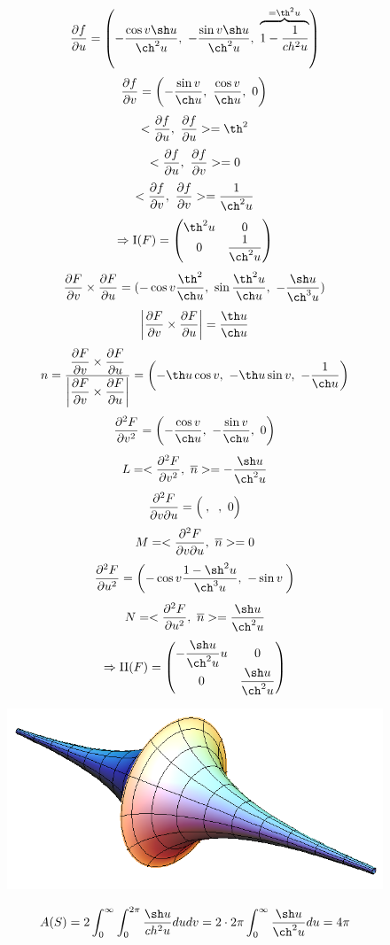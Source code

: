 \documentclass[12pt, fleqn]{article}
\begin{document}
\begin{Sol}
  \[\dfrac{\d f}{\d u} = \Br{-\dfrac{\cos v \sh u}{\ch^2 u},\ -\dfrac{\sin v \sh u}{\ch^2 u},\ \ob{= \th^2 u}{1 - \dfrac{1}{ch^2 u}}}\]
  \[\dfrac{\d f}{\d v} = \Br{-\dfrac{\sin v}{\ch u},\ \dfrac{\cos v}{\ch u},\ 0}\]
  \[<\dfrac{\d f}{\d u},\ \dfrac{\d f}{\d u}> = \th^2\]
  \[<\dfrac{\partial f}{\partial u},\ \dfrac{\partial f}{\partial v}> = 0\]
  \[<\dfrac{\d f}{\d v},\ \dfrac{\d f}{\d v}> = \dfrac{1}{\ch^2 u}\]
  \[\Ra \RNumb{1}(F) = \begin{pmatrix}
    {}\th^2 u & 0\\
    0 & \dfrac{1}{\ch^2 u}
  \end{pmatrix}\]
  \[\frac{\d F}{\d v} \times \frac{\d F}{\d u} =
  (
    -\cos v \dfrac{\th^2}{\ch u},\
    \sin \dfrac{\th^2 u}{\ch u},\
    -\dfrac{\sh u}{\ch^3 u}
  )\]
  \[\abs{\dfrac{\d F}{\d v} \times \dfrac{\d F}{\d u}} = \dfrac{\th u}{\ch u}\]
  \[n =
  \dfrac{
    \dfrac{\d F}{\d v} \times \dfrac{\d F}{\d u}
  }{
    \abs{\dfrac{\d F}{\d v} \times \dfrac{\d F}{\d u}}
  } = \Br{- \th u \cos v,\ -\th u \sin v,\ -\dfrac{1}{\ch u}}\]
  \[\frac{\d^2 F}{\d v^2} = \Br{-\dfrac{\cos v}{\ch u},\ -\dfrac{\sin v}{\ch u},\ 0}\]
  \[L = <\frac{\d^2 F}{\d v^2},\ \ol{n}> = -\dfrac{\sh u}{\ch^2 u}\]
  \[\frac{\partial^2 F}{\partial v \partial u} = \left(\dfrac{}{},\ \dfrac{}{},\ 0\right)\]
  \[M = <\frac{\partial^2 F}{\partial v \partial u},\ \overline{n}> = 0\]
  \[\frac{\d^2 F}{\d u^2} = \Br{-\cos v \dfrac{1-\sh^2 u}{\ch^3 u},\ -\sin v \dfrac{}{}}\]
  \[N = <\frac{\d^2 F}{\d u^2},\ \ol{n}> = \dfrac{\sh u}{\ch^2 u}\]
  \[\Ra \RNumb{2}(F) = \begin{pmatrix}
    -\dfrac{\sh u}{\ch^2 u} u & 0\\
    0 & \dfrac{\sh u}{\ch^2 u}
  \end{pmatrix}\]

  \begin{figure}[H]
      \includegraphics[scale=0.3]{pics/8_1}
      \centering
  \end{figure}

  \[A(S) = 2 \int_0^{\infty} \int_0^{2\pi} \dfrac{\sh u}{ch^2 u} du dv = 2 \cdot 2\pi \int_0^{\infty} \dfrac{\sh u}{\ch^2 u} du = 4\pi\]
\end{Sol}
\end{document}
